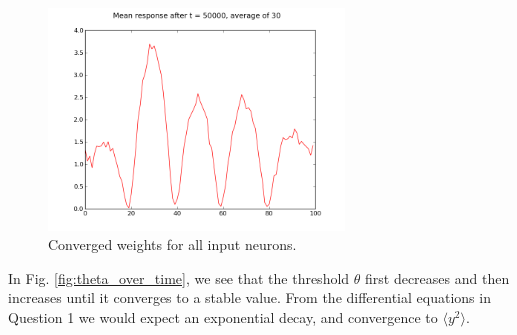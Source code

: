 \begin{figure}[h]
\centering
\includegraphics[width=0.7\textwidth]{../ex2/weights_t50000_mean_results.png}
\caption{Converged weights for all input neurons.}
\label{fig:weights_converged}
\end{figure}

In Fig. \ref{fig:theta_over_time}, we see that the threshold $\theta$ first decreases and then increases until it converges to a stable value. From the differential equations in Question 1 we would expect an exponential decay, and convergence to $\langle y^2\rangle$.


